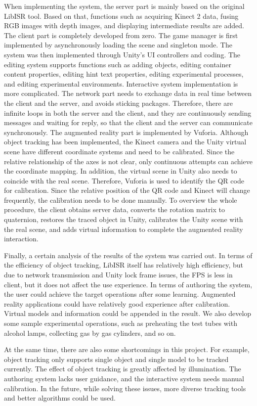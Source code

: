 \begin{bigabstract}
When implementing the system, the server part is mainly based on the original LibISR tool. Based on that, functions such as acquiring Kinect 2 data, fusing RGB images with depth images, and displaying intermediate results are added. The client part is completely developed from zero. The game manager is first implemented by asynchronously loading the scene and singleton mode. The system was then implemented through Unity's UI controllers and coding. The editing system supports functions such as adding objects, editing container content properties, editing hint text properties, editing experimental processes, and editing experimental environments. Interactive system implementation is more complicated. The network part needs to exchange data in real time between the client and the server, and avoids sticking packages. Therefore, there are infinite loops in both the server and the client, and they are continuously sending messages and waiting for reply, so that the client and the server can communicate synchronously. The augmented reality part is implemented by Vuforia. Although object tracking has been implemented, the Kinect camera and the Unity virtual scene have different coordinate systems and need to be calibrated. Since the relative relationship of the axes is not clear, only continuous attempts can achieve the coordinate mapping. In addition, the virtual scene in Unity also needs to coincide with the real scene. Therefore, Vuforia is used to identify the QR code for calibration. Since the relative position of the QR code and Kinect will change frequently, the calibration needs to be done manually. To overview the whole procedure, the client obtains server data, converts the rotation matrix to quaternion, restores the traced object in Unity, calibrates the Unity scene with the real scene, and adds virtual information to complete the augmented reality interaction.

Finally, a certain analysis of the results of the system was carried out. In terms of the efficiency of object tracking, LibISR itself has relatively high efficiency, but due to network transmission and Unity lock frame issues, the FPS is less in client, but it does not affect the use experience. In terms of authoring the system, the user could achieve the target operations after some learning. Augmented reality applications could have relatively good experience after calibration. Virtual models and information could be appended in the result. We also develop some sample experimental operations, such as preheating the test tubes with alcohol lamps, collecting gas by gas cylinders, and so on.

At the same time, there are also some shortcomings in this project. For example, object tracking only supports single object and single model to be tracked currently. The effect of object tracking is greatly affected by illumination. The authoring system lacks user guidance, and the interactive system needs manual calibration. In the future, while solving these issues, more diverse tracking tools and better algorithms could be used.

\end{bigabstract}